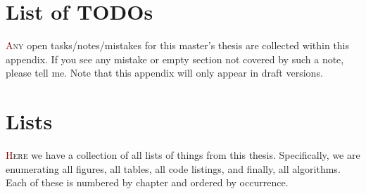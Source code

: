 \documentclass[%
	paper=A4,
	twoside=true,
	openright,
	parskip=half,           %
  11pt,
	chapterprefix=true,     %
	headings=normal,        %
	bibliography=totocnumbered,     %
	titlepage=on,           %
	captions=tableabove,    %
]{scrbook}
\let\listofalgorithms\listoffigures%
\renewcommand{\listoflistings}{%
  \listof{listing}{\listoflistingscaption}%
}
\begin{document}
\makeatletter
\renewcommand\listoffixmes{%
	\chapter{List of TODOs}
	\lettrine[lines=3]{\textcolor{Maroon}{A}}{ny} open tasks/notes/mistakes for this master's thesis are collected within this appendix.
	If you see any mistake or empty section not covered by such a note, please tell me.
	Note that this appendix will only appear in draft versions.

	\@starttoc{lox}%
}
\makeatother


\renewcommand{\glslongextraNameAlign}[0]{r}

\listoffixmes



\renewcommand{\glslongextraNameDescTabularHeader}{
	\toprule
	\glslongextraHeaderFmt{Filename} &
	\glslongextraHeaderFmt\descriptionname\tabularnewline
	\midrule
}

\printglossary[type=main,style={index}]
\printglossary[type=\acronymtype,style={index}]
\setlength{\LTleft}{0pt}
\printunsrtglossary[type=file,style={long-booktabs}]

\makeatletter
\renewcommand{\listoffigures}{\section{\listfigurename}\@starttoc{lof}}
\renewcommand{\listoftables}{\section{\listtablename}\@starttoc{lot}}
\renewcommand{\listoflistings}{\section{\lstlistlistingname}\@starttoc{lol}}
\renewcommand{\listofalgorithms}{\section{\listalgorithmname}\@starttoc{loa}}
\makeatother

{
	\hypersetup{hidelinks}
	\chapter{Lists}
	\lettrine[lines=3]{\textcolor{Maroon}{H}}{ere} we have a collection of all lists of things from this thesis.
	Specifically, we are enumerating all figures, all tables, all code listings, and finally, all algorithms.
	Each of these is numbered by chapter and ordered by occurrence.

	\listoffigures

	\listoftables

	\listoflistings

	\listofalgorithms
}

\printbibliography[heading=bibnumbered]
\end{document}
